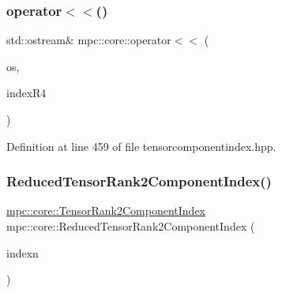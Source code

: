 \mbox{\label{namespacempc_1_1core_afbf6f256794f47576046fcc1595ac21a}} 
\subsubsection{\texorpdfstring{operator$<$$<$()}{operator<<()}\hspace{0.1cm}{\footnotesize\ttfamily [4/4]}}
{\footnotesize\ttfamily std\+::ostream\& mpc\+::core\+::operator$<$$<$ (\begin{DoxyParamCaption}\item[{std\+::ostream \&}]{os,  }\item[{\mbox{\hyperlink{classmpc_1_1core_1_1_tensor_rank_n_component_index}{Tensor\+Rank\+N\+Component\+Index}}$<$ 4 $>$}]{index\+R4 }\end{DoxyParamCaption})\hspace{0.3cm}{\ttfamily [inline]}}



Definition at line 459 of file tensorcomponentindex.\+hpp.

\mbox{\label{namespacempc_1_1core_a1c54881498b05ba5ae2813859990a2e3}} 
\subsubsection{\texorpdfstring{Reduced\+Tensor\+Rank2\+Component\+Index()}{ReducedTensorRank2ComponentIndex()}}
{\footnotesize\ttfamily \mbox{\hyperlink{namespacempc_1_1core_a7ae080dac58868c1e167479dce34928a}{mpc\+::core\+::\+Tensor\+Rank2\+Component\+Index}} mpc\+::core\+::\+Reduced\+Tensor\+Rank2\+Component\+Index (\begin{DoxyParamCaption}\item[{const \mbox{\hyperlink{namespacempc_1_1core_a7ae080dac58868c1e167479dce34928a}{mpc\+::core\+::\+Tensor\+Rank2\+Component\+Index}} \&}]{indexn }\end{DoxyParamCaption})\hspace{0.3cm}{\ttfamily [inline]}}




